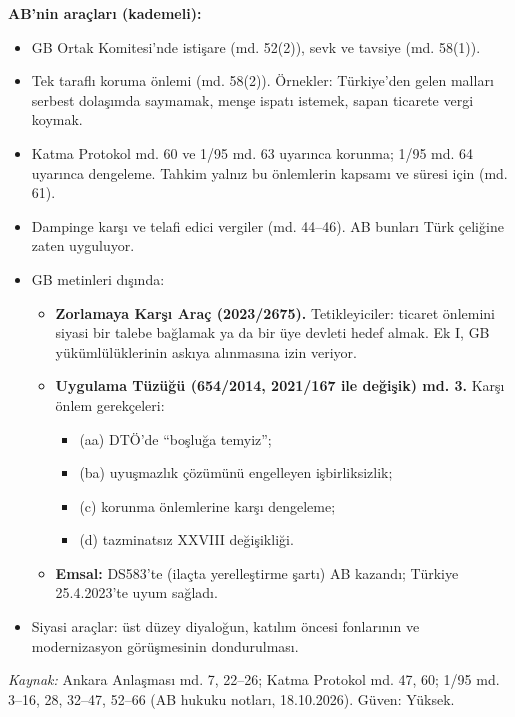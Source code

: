 \endgroup

\textbf{AB'nin araçları (kademeli):}

\begin{itemize}
\tightlist
\item
  GB Ortak Komitesi'nde istişare (md. 52(2)), sevk ve tavsiye (md. 58(1)).
\item
  Tek taraflı koruma önlemi (md. 58(2)). Örnekler: Türkiye'den gelen malları serbest dolaşımda saymamak, menşe ispatı istemek, sapan ticarete vergi koymak.
\item
  Katma Protokol md. 60 ve 1/95 md. 63 uyarınca korunma; 1/95 md. 64 uyarınca dengeleme. Tahkim yalnız bu önlemlerin kapsamı ve süresi için (md. 61).
\item
  Dampinge karşı ve telafi edici vergiler (md. 44--46). AB bunları Türk çeliğine zaten uyguluyor.
\item
  GB metinleri dışında:

  \begin{itemize}
  \tightlist
  \item
    \textbf{Zorlamaya Karşı Araç (2023/2675).} Tetikleyiciler: ticaret önlemini siyasi bir talebe bağlamak ya da bir üye devleti hedef almak. Ek I, GB yükümlülüklerinin askıya alınmasına izin veriyor.
  \item
    \textbf{Uygulama Tüzüğü (654/2014, 2021/167 ile değişik) md. 3.} Karşı önlem gerekçeleri:

    \begin{itemize}
    \tightlist
    \item
      (aa) DTÖ'de ``boşluğa temyiz'';
    \item
      (ba) uyuşmazlık çözümünü engelleyen işbirliksizlik;
    \item
      (c) korunma önlemlerine karşı dengeleme;
    \item
      (d) tazminatsız XXVIII değişikliği.
    \end{itemize}
  \item
    \textbf{Emsal:} DS583'te (ilaçta yerelleştirme şartı) AB kazandı; Türkiye 25.4.2023'te uyum sağladı.
  \end{itemize}
\item
  Siyasi araçlar: üst düzey diyaloğun, katılım öncesi fonlarının ve modernizasyon görüşmesinin dondurulması.
\end{itemize}

\emph{Kaynak:} \etiketV{} Ankara Anlaşması md. 7, 22--26; Katma Protokol md. 47, 60; 1/95 md. 3--16, 28, 32--47, 52--66 (AB hukuku notları, 18.10.2026). Güven: Yüksek.

